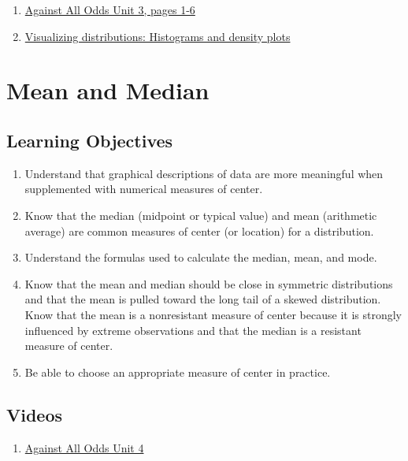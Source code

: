 \documentclass[letterpaper,9pt,twocolumn,twoside,printwatermark=false]{pinp}
\providecommand{\tightlist}{%
  \setlength{\itemsep}{0pt}\setlength{\parskip}{0pt}}
\begin{document}
\begin{enumerate}
\def\labelenumi{\arabic{enumi}.}
\tightlist
\item
  \href{https://www.learner.org/courses/againstallodds/pdfs/AgainstAllOdds_StudentGuide_Unit03.pdf\#page=1}{Against
  All Odds Unit 3, pages 1-6}
\item
  \href{https://serialmentor.com/dataviz/histograms-density-plots.html}{Visualizing
  distributions: Histograms and density plots}
\end{enumerate}

\section{Mean and Median}\label{mean-and-median}

\subsection{Learning Objectives}\label{learning-objectives-1}

\begin{enumerate}
\def\labelenumi{\arabic{enumi}.}
\tightlist
\item
  Understand that graphical descriptions of data are more meaningful
  when supplemented with numerical measures of center.
\item
  Know that the median (midpoint or typical value) and mean (arithmetic
  average) are common measures of center (or location) for a
  distribution.
\item
  Understand the formulas used to calculate the median, mean, and mode.
\item
  Know that the mean and median should be close in symmetric
  distributions and that the mean is pulled toward the long tail of a
  skewed distribution. Know that the mean is a nonresistant measure of
  center because it is strongly influenced by extreme observations and
  that the median is a resistant measure of center.
\item
  Be able to choose an appropriate measure of center in practice.
\end{enumerate}

\subsection{Videos}\label{videos-1}

\begin{enumerate}
\def\labelenumi{\arabic{enumi}.}
\tightlist
\item
  \href{https://www.learner.org/courses/againstallodds/unitpages/unit04.html}{Against
  All Odds Unit 4}
\end{enumerate}
\end{document}
